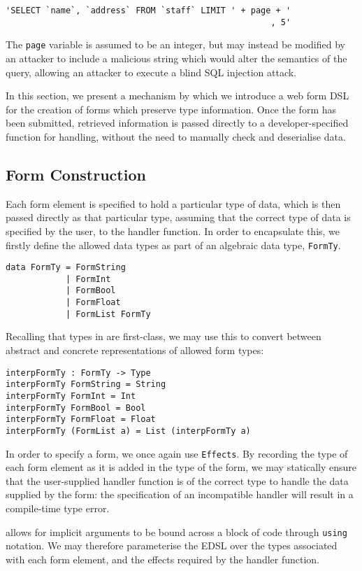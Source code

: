 \documentclass[preprint]{sigplanconf}
\begin{document}
\begin{Verbatim}
'SELECT `name`, `address` FROM `staff` LIMIT ' + page + '
                                                     , 5'
\end{Verbatim}
The \texttt{page} variable is assumed to be an integer, but may instead be modified by an attacker to include a malicious string which would alter the semantics of the query, allowing an attacker to execute a blind SQL injection attack. %

In this section, we present a mechanism by which we introduce a web form DSL for the creation of forms which preserve type information. Once the form has been submitted, retrieved information is passed directly to a developer-specified function for handling, without the need to manually check and deserialise data. 

\subsection{Form Construction}
Each form element is specified to hold a particular type of data, which is then passed directly as that particular type, assuming that the correct type of data is specified by the user, to the handler function. In order to encapsulate this, we firstly define the allowed data types as part of an algebraic data type, \texttt{FormTy}.
\begin{Verbatim}
data FormTy = FormString
            | FormInt
            | FormBool
            | FormFloat
            | FormList FormTy 
\end{Verbatim}
Recalling that types in \idris{} are first-class, we may use this to convert between abstract and concrete representations of allowed form types:
\begin{Verbatim}
interpFormTy : FormTy -> Type
interpFormTy FormString = String
interpFormTy FormInt = Int
interpFormTy FormBool = Bool
interpFormTy FormFloat = Float
interpFormTy (FormList a) = List (interpFormTy a)
\end{Verbatim}
%
In order to specify a form, we once again use \texttt{Effects}. By recording the type of each form element as it is added in the type of the form, we may statically ensure that the user-supplied handler function is of the correct type to handle the data supplied by the form: the specification of an incompatible handler will result in a compile-time type error.

\idris{} allows for implicit arguments to be bound across a block of code through \texttt{using} notation. We may therefore parameterise the EDSL over the types associated with each form element, and the effects required by the handler function.
\end{document}
